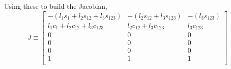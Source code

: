 \documentclass[12pt]{article}
\begin{document}
Using these to build the Jacobian,
\[
  J \equiv
  \begin{bmatrix}
    -(l_1s_1 + l_2s_{12} + l_3s_{123}) & -(l_2s_{12} + l_3s_{123}) & -(l_3s_{123})\\
    l_1c_1 + l_2c_{12} + l_3c_{123} & l_2c_{12} + l_3c_{123} & l_3c_{123}\\
    0 & 0 & 0 \\
    0 & 0 & 0 \\
    0 & 0 & 0 \\
    1 & 1 & 1 \\
  \end{bmatrix}
\]

\pagebreak

\section{}
\section{}
\section{}
\end{document}
